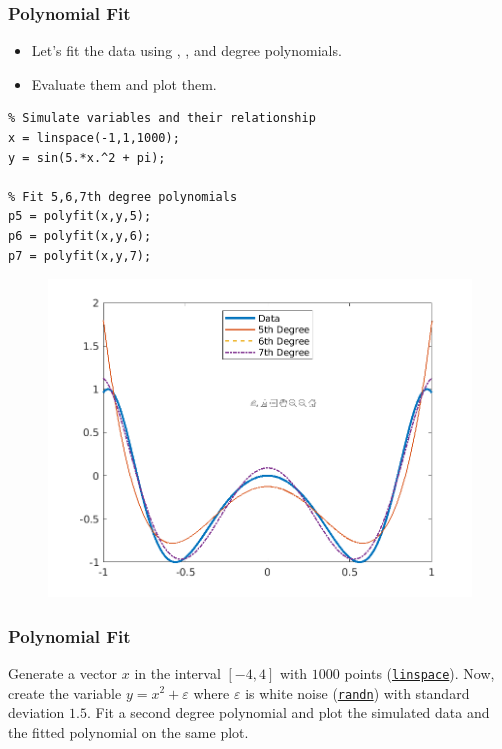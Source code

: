 \documentclass[11pt,xcolor={svgnames},aspectratio=169,usepdftitle=false,notheorems]{beamer}
\begin{document}
\begin{frame}[fragile]
  \frametitle{Polynomial Fit}
  \begin{itemize}
    \item Let's fit the data using , , and  degree polynomials.
    \item Evaluate them and plot them.
  \end{itemize}

\begin{minipage}{0.45\textwidth}
\begin{lstlisting}
% Simulate variables and their relationship
x = linspace(-1,1,1000);
y = sin(5.*x.^2 + pi);
  
% Fit 5,6,7th degree polynomials
p5 = polyfit(x,y,5);
p6 = polyfit(x,y,6);
p7 = polyfit(x,y,7);
\end{lstlisting}
\end{minipage}
\begin{minipage}{0.45\textwidth}
\begin{figure}
  \centering
    \includegraphics[width = \textwidth]{../figures/poly_fit.png}
\end{figure}
\end{minipage}
\end{frame}

\begin{frame}
    \frametitle{Polynomial Fit}
\begin{exercise}
  Generate a vector $x$ in the interval $[-4,4]$ with $1000$ points (\href{https://www.mathworks.com/help/matlab/ref/linspace.html}{\normalfont \texttt{linspace}}). Now, create the variable $y = x^2 + \varepsilon$ where $\varepsilon$ is white noise (\href{https://www.mathworks.com/help/matlab/ref/randn.html}{\normalfont\texttt{randn}}) with standard  deviation $1.5$. Fit a second degree polynomial and plot the simulated data and the fitted polynomial on the same plot.
\end{exercise}
\end{frame}
\end{document}
